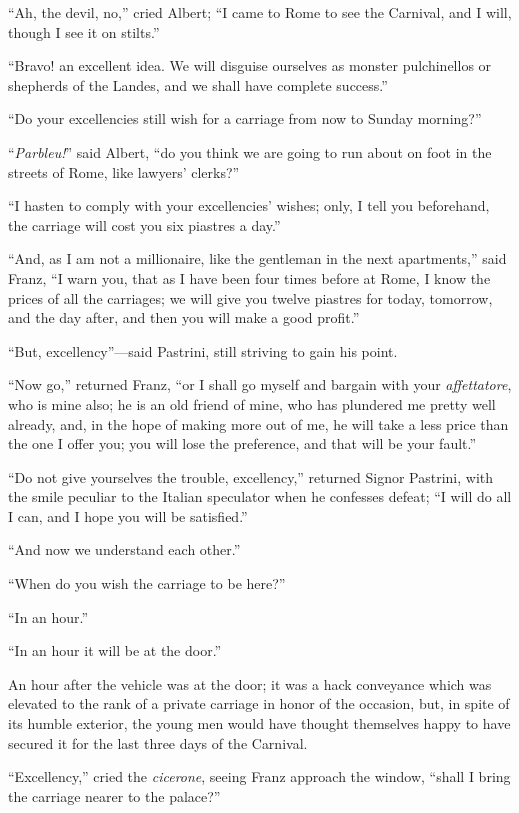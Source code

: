“Ah, the devil, no,” cried Albert; “I came to Rome to see the Carnival,
and I will, though I see it on stilts.”

“Bravo! an excellent idea. We will disguise ourselves as monster
pulchinellos or shepherds of the Landes, and we shall have complete
success.”

“Do your excellencies still wish for a carriage from now to Sunday
morning?”

“\textit{Parbleu!}” said Albert, “do you think we are going to run about on
foot in the streets of Rome, like lawyers’ clerks?”

“I hasten to comply with your excellencies’ wishes; only, I tell you
beforehand, the carriage will cost you six piastres a day.”

“And, as I am not a millionaire, like the gentleman in the next
apartments,” said Franz, “I warn you, that as I have been four times
before at Rome, I know the prices of all the carriages; we will give
you twelve piastres for today, tomorrow, and the day after, and then
you will make a good profit.”

“But, excellency”—said Pastrini, still striving to gain his point.

“Now go,” returned Franz, “or I shall go myself and bargain with your
\textit{affettatore}, who is mine also; he is an old friend of mine, who has
plundered me pretty well already, and, in the hope of making more out
of me, he will take a less price than the one I offer you; you will
lose the preference, and that will be your fault.”

“Do not give yourselves the trouble, excellency,” returned Signor
Pastrini, with the smile peculiar to the Italian speculator when he
confesses defeat; “I will do all I can, and I hope you will be
satisfied.”

“And now we understand each other.”

“When do you wish the carriage to be here?”

“In an hour.”

“In an hour it will be at the door.”

An hour after the vehicle was at the door; it was a hack conveyance
which was elevated to the rank of a private carriage in honor of the
occasion, but, in spite of its humble exterior, the young men would
have thought themselves happy to have secured it for the last three
days of the Carnival.

“Excellency,” cried the \textit{cicerone}, seeing Franz approach the window,
“shall I bring the carriage nearer to the palace?”

